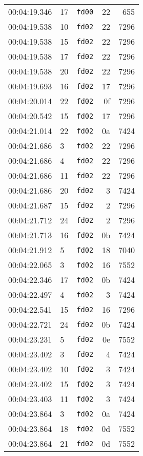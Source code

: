 \documentclass{article}
\begin{document}
\begin{longtable}{lllrr}
00:04:19.346 & 17 & \texttt{fd00} & 22 & 655 \\
00:04:19.538 & 10 & \texttt{fd02} & 22 & 7296 \\
00:04:19.538 & 15 & \texttt{fd02} & 22 & 7296 \\
00:04:19.538 & 17 & \texttt{fd02} & 22 & 7296 \\
00:04:19.538 & 20 & \texttt{fd02} & 22 & 7296 \\
00:04:19.693 & 16 & \texttt{fd02} & 17 & 7296 \\
00:04:20.014 & 22 & \texttt{fd02} & 0f & 7296 \\
00:04:20.542 & 15 & \texttt{fd02} & 17 & 7296 \\
00:04:21.014 & 22 & \texttt{fd02} & 0a & 7424 \\
00:04:21.686 & 3 & \texttt{fd02} & 22 & 7296 \\
00:04:21.686 & 4 & \texttt{fd02} & 22 & 7296 \\
00:04:21.686 & 11 & \texttt{fd02} & 22 & 7296 \\
00:04:21.686 & 20 & \texttt{fd02} & 3 & 7424 \\
00:04:21.687 & 15 & \texttt{fd02} & 2 & 7296 \\
00:04:21.712 & 24 & \texttt{fd02} & 2 & 7296 \\
00:04:21.713 & 16 & \texttt{fd02} & 0b & 7424 \\
00:04:21.912 & 5 & \texttt{fd02} & 18 & 7040 \\
00:04:22.065 & 3 & \texttt{fd02} & 16 & 7552 \\
00:04:22.346 & 17 & \texttt{fd02} & 0b & 7424 \\
00:04:22.497 & 4 & \texttt{fd02} & 3 & 7424 \\
00:04:22.541 & 15 & \texttt{fd02} & 16 & 7296 \\
00:04:22.721 & 24 & \texttt{fd02} & 0b & 7424 \\
00:04:23.231 & 5 & \texttt{fd02} & 0e & 7552 \\
00:04:23.402 & 3 & \texttt{fd02} & 4 & 7424 \\
00:04:23.402 & 10 & \texttt{fd02} & 3 & 7424 \\
00:04:23.402 & 15 & \texttt{fd02} & 3 & 7424 \\
00:04:23.403 & 11 & \texttt{fd02} & 3 & 7424 \\
00:04:23.864 & 3 & \texttt{fd02} & 0a & 7424 \\
00:04:23.864 & 18 & \texttt{fd02} & 0d & 7552 \\
00:04:23.864 & 21 & \texttt{fd02} & 0d & 7552 \\

\end{longtable}
\end{document}
